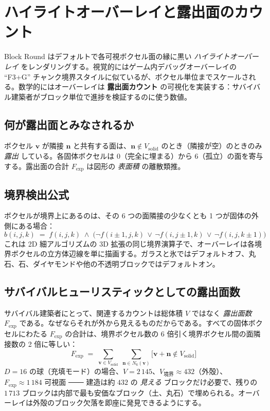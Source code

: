 \documentclass[12pt,a4paper]{scrartcl}
\newcommand{\acc}[1]{\textcolor{accent}{\textbf{#1}}}
\begin{document}
\section{ハイライトオーバーレイと露出面のカウント}

Block Round はデフォルトで各可視ボクセル面の縁に黒い \emph{ハイライトオーバーレイ} をレンダリングする。視覚的にはゲーム内デバッグオーバーレイの \enquote{F3+G} チャンク境界スタイルに似ているが、ボクセル単位までスケールされる。数学的にはオーバーレイは \acc{露出面カウント} の可視化を実装する：サバイバル建築者がブロック単位で進捗を検証するのに使う数値。

\subsection{何が露出面とみなされるか}
ボクセル $\mathbf{v}$ が隣接 $\mathbf{n}$ と共有する面は、$\mathbf{n} \notin V_{\mathrm{solid}}$ のとき（隣接が空）のときのみ \emph{露出} している。各固体ボクセルは $0$（完全に埋まる）から $6$（孤立）の面を寄与する。露出面の合計 $F_{\mathrm{exp}}$ は図形の \emph{表面積} の離散類推。

\subsection{境界検出公式}
ボクセルが境界上にあるのは、その 6 つの面隣接の少なくとも 1 つが固体の外側にある場合：
\[
b(i,j,k) \;=\; f(i,j,k) \;\wedge\; \bigl(\neg f(i{\pm}1,j,k)\,\vee\,\neg f(i,j{\pm}1,k)\,\vee\,\neg f(i,j,k{\pm}1)\bigr)
\]
これは 2D 細アルゴリズムの 3D 拡張の同じ境界演算子で、オーバーレイは各境界ボクセルの立方体辺線を単に描画する。ガラスと氷ではデフォルトオフ、丸石、石、ダイヤモンドや他の不透明ブロックではデフォルトオン。

\subsection{サバイバルヒューリスティックとしての露出面数}
サバイバル建築者にとって、関連するカウントは総体積 $V$ ではなく \emph{露出面数} $F_{\mathrm{exp}}$ である。なぜならそれが外から見えるものだからである。すべての固体ボクセルにわたる $F_{\mathrm{exp}}$ の合計は、境界ボクセル数の 6 倍引く境界ボクセル間の面隣接数の 2 倍に等しい：
\[
F_{\mathrm{exp}} \;=\; \sum_{\mathbf{v}\in V_{\mathrm{solid}}}\;\sum_{\mathbf{n}\in N_6(\mathbf{v})}\!\!\bigl[\mathbf{v}+\mathbf{n}\notin V_{\mathrm{solid}}\bigr]
\]
$D=16$ の球（充填モード）の場合、$V = 2\,145$、$V_{\mathrm{境界}} \approx 432$（外殻）、$F_{\mathrm{exp}} \approx 1\,184$ 可視面 ─── 建造は約 $432$ の \emph{見える} ブロックだけ必要で、残りの $1\,713$ ブロックは内部で最も安価なブロック（土、丸石）で埋められる。オーバーレイは外殻のブロック欠落を即座に発見できるようにする。
\end{document}
